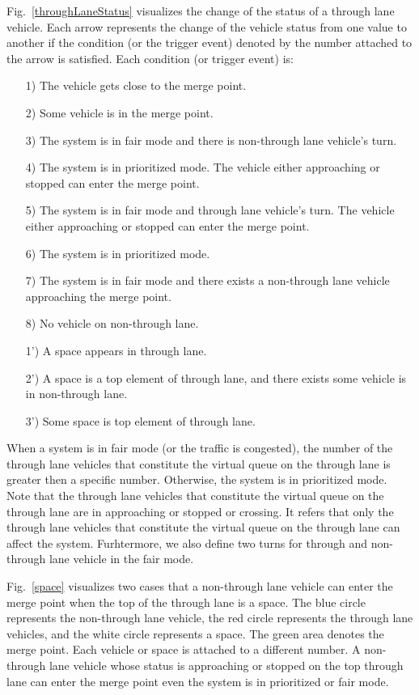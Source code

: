 \documentclass[10pt, conference, compsocconf]{IEEEtran}
\begin{document}
Fig.~\ref{throughLaneStatus} visualizes the change of the status
of a through lane vehicle.  Each arrow represents the change of the
vehicle status from one value to another if the condition (or the
trigger event) denoted by the number attached to the arrow is
satisfied.  Each condition (or trigger event) is:
\begin{itemize}[]
    \item[1)] The vehicle gets close to the merge point. %
    \item[2)] Some vehicle is in the merge point. %
    \item[3)] The system is in fair mode and there is non-through lane vehicle's turn. %
    \item[4)] The system is in prioritized mode. The vehicle either approaching or stopped 
    can enter the merge point. %
    \item[5)] The system is in fair mode and through lane vehicle's turn. The vehicle either 
    approaching or stopped can enter the merge point. %
    \item[6)] The system is in prioritized mode. %
    \item[7)] The system is in fair mode and there exists a non-through lane vehicle approaching the 
    merge point. %
    \item[8)] No vehicle on non-through lane.
    \item[1')] A space appears in through lane. %
    \item[2')] A space is a top element of through lane, and there exists some vehicle 
    is in non-through lane. %
    \item[3')] Some space is top element of through lane. %
\end{itemize}

When a system is in fair mode (or the traffic is congested), the number of the through lane
vehicles that constitute the virtual queue on the through lane is
greater then a specific number. Otherwise, the system is in prioritized mode.
Note that the through lane vehicles that constitute the virtual queue on the
through lane are in approaching or stopped or crossing.
It refers that only the through lane vehicles that constitute the virtual queue
on the through lane can affect the system. Furhtermore, we also define two turns 
for through and non-through lane vehicle in the fair mode.

Fig.~\ref{space} visualizes two cases that a non-through lane vehicle can enter
the merge point when the top of the through lane is a space.
The blue circle
represents the non-through lane vehicle, the red circle represents the
through lane vehicles, and the white circle represents a space. The green
area denotes the merge point. Each vehicle or space is attached to a
different number.
A non-through lane vehicle whose status is approaching or stopped on the top through lane
can enter the merge point even the system is in prioritized or fair mode.
\end{document}
